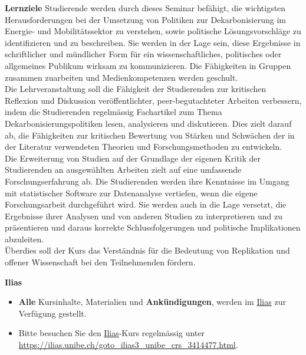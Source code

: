 \documentclass[12pt,a4paper]{article}
\begin{document}
\medskip
\noindent\textbf{Lernziele}
Studierende werden durch dieses Seminar befähigt, die wichtigsten Herausforderungen bei der Umsetzung von Politiken zur Dekarbonisierung im Energie- und Mobilitätssektor zu verstehen, sowie politische Lösungsvorschläge zu identifizieren und zu beschreiben. Sie werden in der Lage sein, diese Ergebnisse in schriftlicher und mündlicher Form für ein wissenschaftliches, politisches oder allgemeines Publikum wirksam zu kommunizieren. Die Fähigkeiten in Gruppen zusammen zuarbeiten und Medienkompetenzen werden geschult.\\
Die Lehrveranstaltung soll die Fähigkeit der Studierenden zur kritischen Reflexion und Diskussion veröffentlichter, peer-begutachteter Arbeiten verbessern, indem die Studierenden regelmässig Fachartikel zum Thema Dekarbonisierungspolitiken lesen, analysieren und diskutieren. Dies zielt darauf ab, die Fähigkeiten zur kritischen Bewertung von Stärken und Schwächen der in der Literatur verwendeten Theorien und Forschungsmethoden zu entwickeln.\\
Die Erweiterung von Studien auf der Grundlage der eigenen Kritik der Studierenden an ausgewählten Arbeiten zielt auf eine umfassende Forschungserfahrung ab. Die Studierenden werden ihre Kenntnisse im Umgang mit statistischer Software zur Datenanalyse vertiefen, wenn die eigene Forschungsarbeit durchgeführt wird. Sie werden auch in die Lage versetzt, die Ergebnisse ihrer Analysen und von anderen Studien zu interpretieren und zu präsentieren und daraus korrekte Schlussfolgerungen und politische Implikationen abzuleiten.\\
Überdies soll der Kurs das Verständnis für die Bedeutung von Replikation und offener Wissenschaft bei den Teilnehmenden fördern.



\medskip
\noindent\textbf{Ilias} 
 \begin{itemize}

\item \textbf{Alle} Kursinhalte, Materialien und \textbf{Ankündigungen}, 
 werden im \href{https://ilias.unibe.ch/goto_ilias3_unibe_crs_3414477.html}{Ilias} zur Verfügung gestellt. 
\item  Bitte besuchen Sie den \href{https://ilias.unibe.ch/goto_ilias3_unibe_crs_3414477.html}{Ilias}-Kurs regelmässig unter \url{https://ilias.unibe.ch/goto_ilias3_unibe_crs_3414477.html}. 
 \end{itemize}
\end{document}
